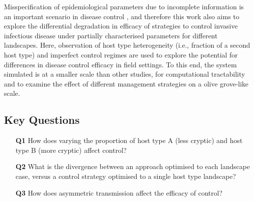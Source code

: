 \documentclass[11pt,letterpaper]{article}
\begin{document}
 Misspecification of epidemiological parameters due to incomplete information is an important scenario in disease control \cite{Cunniffe2015, HyattTwynam2017}, and therefore this work also aims to explore the differential degradation in efficacy of strategies to control invasive infectious disease under partially characterised parameters for different landscapes. Here, observation of host type heterogeneity (i.e., fraction of a second host type) and imperfect control regimes are used to explore the potential for differences in disease control efficacy in field settings. To this end, the system simulated is at a smaller scale than other studies, for computational tractability and to examine the effect of different management strategies on a olive grove-like scale. 
\begin{framed}
	\subsection*{ \label{question} Key Questions}
\begin{itemize}
	
   \item[\textbf{Q1}] \label{Q1} How does varying the proportion of host type A (less cryptic) and host type B (more cryptic) affect control? 
   
   \item[\textbf{Q2}] \label{Q2} What is the divergence between an approach optimised to each landscape case, versus a control strategy optimised to a single host type landscape? 
   
    \item[\textbf{Q3}] \label{Q3} {How does asymmetric transmission affect the efficacy of control?}
    
\end{itemize}
\end{framed}
\end{document}
